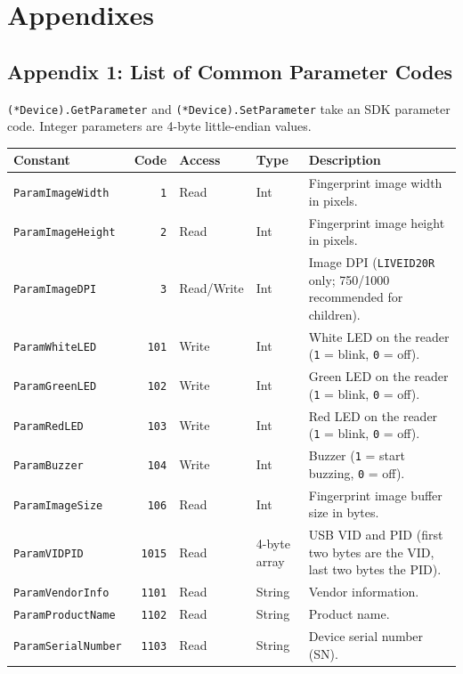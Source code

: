 \documentclass[11pt, a4paper]{article}
\begin{document}
\newpage
\section{Appendixes}

\subsection{Appendix 1: List of Common Parameter Codes}
\texttt{(*Device).GetParameter} and \texttt{(*Device).SetParameter} take an SDK parameter code. Integer parameters are 4-byte little-endian values.

\begin{table}[htbp]
\centering
\small
\setlength{\tabcolsep}{4pt}
\begin{tabularx}{\textwidth}{l r l l X}
\toprule
\textbf{Constant} & \textbf{Code} & \textbf{Access} & \textbf{Type} & \textbf{Description} \\
\midrule
\texttt{ParamImageWidth} & \texttt{1} & Read & Int & Fingerprint image width in pixels. \\
\texttt{ParamImageHeight} & \texttt{2} & Read & Int & Fingerprint image height in pixels. \\
\texttt{ParamImageDPI} & \texttt{3} & Read/Write & Int & Image DPI (\texttt{LIVEID20R} only; 750/1000 recommended for children). \\
\texttt{ParamWhiteLED} & \texttt{101} & Write & Int & White LED on the reader (\texttt{1} = blink, \texttt{0} = off). \\
\texttt{ParamGreenLED} & \texttt{102} & Write & Int & Green LED on the reader (\texttt{1} = blink, \texttt{0} = off). \\
\texttt{ParamRedLED} & \texttt{103} & Write & Int & Red LED on the reader (\texttt{1} = blink, \texttt{0} = off). \\
\texttt{ParamBuzzer} & \texttt{104} & Write & Int & Buzzer (\texttt{1} = start buzzing, \texttt{0} = off). \\
\texttt{ParamImageSize} & \texttt{106} & Read & Int & Fingerprint image buffer size in bytes. \\
\texttt{ParamVIDPID} & \texttt{1015} & Read & 4-byte array & USB VID and PID (first two bytes are the VID, last two bytes the PID). \\
\texttt{ParamVendorInfo} & \texttt{1101} & Read & String & Vendor information. \\
\texttt{ParamProductName} & \texttt{1102} & Read & String & Product name. \\
\texttt{ParamSerialNumber} & \texttt{1103} & Read & String & Device serial number (SN). \\

\end{tabularx}
\end{table}
\end{document}
